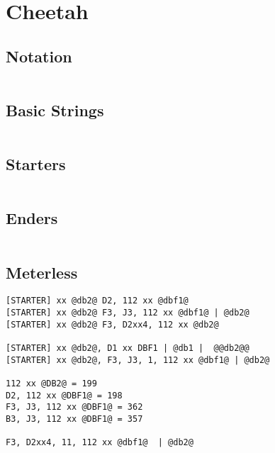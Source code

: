 \documentclass[main.tex]{subfiles}
\begin{document}
\chapter{Cheetah}

\section{Notation}
\begin{lstlisting}[language=FG]
\end{lstlisting}


\section{Basic Strings}

\begin{lstlisting}[language=FG]
\end{lstlisting}

\section{Starters}
\begin{lstlisting}[language=FG]

\end{lstlisting}

\section{Enders}

\begin{lstlisting}[language=FG]
\end{lstlisting}

\section{Meterless}


\begin{lstlisting}[language=FG]
[STARTER] xx @db2@ D2, 112 xx @dbf1@
[STARTER] xx @db2@ F3, J3, 112 xx @dbf1@ | @db2@
[STARTER] xx @db2@ F3, D2xx4, 112 xx @db2@

[STARTER] xx @db2@, D1 xx DBF1 | @db1 |  @@db2@@
[STARTER] xx @db2@, F3, J3, 1, 112 xx @dbf1@ | @db2@

112 xx @DB2@ = 199
D2, 112 xx @DBF1@ = 198
F3, J3, 112 xx @DBF1@ = 362
B3, J3, 112 xx @DBF1@ = 357

F3, D2xx4, 11, 112 xx @dbf1@  | @db2@
\end{lstlisting}
\end{document}
